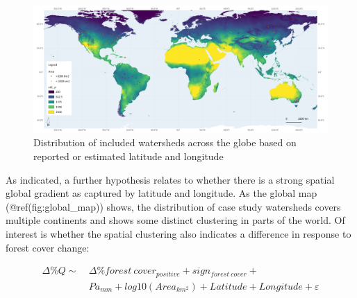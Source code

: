 \documentclass[]{elsarticle} %
\begin{document}
\begin{figure}
\includegraphics[width=0.9\linewidth]{../../data/FAOET0data2} \caption{Distribution of included watersheds across the globe based on reported or estimated latitude and longitude}\label{fig:global_map}
\end{figure}

As indicated, a further hypothesis relates to whether there is a strong
spatial global gradient as captured by latitude and longitude. As the
global map (@ref(fig:global\_map)) shows, the distribution of case study
watersheds covers multiple continents and shows some distinct clustering
in parts of the world. Of interest is whether the spatial clustering
also indicates a difference in response to forest cover change:

\[\tag{5}
\begin{aligned}
\Delta \% Q \sim ~ &\Delta \% forest~cover_{positive} + sign_{forest~cover} + \\ & Pa_{mm} + log10(Area_{km^2}) + Latitude + Longitude + \varepsilon
\end{aligned}\]
\end{document}
